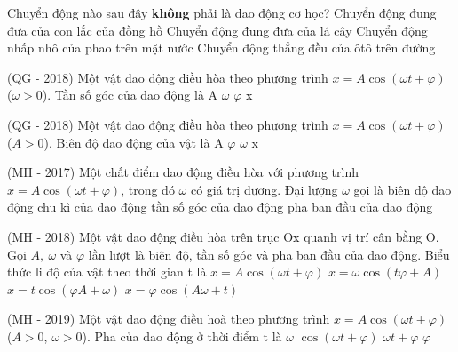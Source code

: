 \setcounter{ex}{0}
\setcounter{paragraph}{0}
\PhanI
\begin{ex}
Chuyển động nào sau đây \textbf{không} phải là dao động cơ học?
\choice
{Chuyển động đung đưa của con lắc của đồng hồ}
{Chuyển động đung đưa của lá cây}
{Chuyển động nhấp nhô của phao trên mặt nước}
{\True Chuyển động thẳng đều của ôtô trên đường}
\loigiai{}
\end{ex}
\begin{ex} %
(QG - 2018) Một vật dao động điều hòa theo phương trình $x = A\cos\left(\omega t + \varphi \right)$ ($\omega  > 0$). Tần số góc của dao động là
\choice
{A}
{\True $\omega$}
{$\varphi$}
{x}
\end{ex} 
\begin{ex} %
(QG - 2018) Một vật dao động điều hòa theo phương trình $x = A\cos\left(\omega t + \varphi \right)$ ($A > 0$). Biên độ dao động của vật là
\choice
{\True A}
{$\varphi$}
{$\omega$}
{x}
\end{ex} 
\begin{ex} %
(MH - 2017) Một chất điểm dao động điều hòa với phương trình $x=A\cos\left(\omega t+\varphi\right)$, trong đó $\omega $ có giá trị dương. Đại lượng $\omega$ gọi là
\choice
{biên độ dao động}
{chu kì của dao động}
{\True tần số góc của dao động}
{pha ban đầu của dao động}
\end{ex} 
\begin{ex} %
(MH - 2018) Một vật dao động điều hòa trên trục Ox quanh vị trí cân bằng O. Gọi $A,\ \omega$ và $\varphi$ lần lượt là biên độ, tần số góc và pha ban đầu của dao động. Biểu thức li độ của vật theo thời gian t là
\choice
{\True $x = A\cos\left(\omega t + \varphi\right)$}
{$x = \omega \cos\left(t\varphi +A\right) $}
{$x = t\cos\left(\varphi A + \omega\right)$}
{$x = \varphi \cos\left(A\omega +t\right)$}
\end{ex} 
\begin{ex} %
(MH - 2019) Một vật dao động điều hoà theo phương trình $x = A\cos\left(\omega t + \varphi\right)$ ($A >0$, $\omega > 0$). Pha của dao động ở thời điểm t là
\choice
{$\omega$}
{$\cos\left(\omega t + \varphi\right)$}
{\True $\omega t + \varphi$}
{$\varphi$}
\end{ex} 
